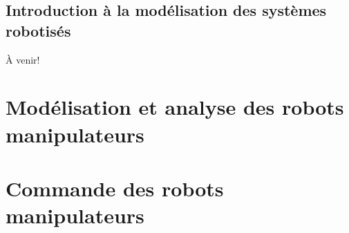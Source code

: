 \documentclass[letterpaper,oneside,french]{book}
\begin{document}

\setcounter{tocdepth}{0}\noptcrule
{\hypersetup{linkcolor=black}
\doparttoc[n]
\tableofcontents
\newpage
}


\chapter{Introduction à la modélisation des systèmes robotisés} À venir!


\part{Modélisation et analyse des robots manipulateurs}
\label{sec:manip}
{\hypersetup{linkcolor=black}
\parttoc
}

% 
% 
% 
% 
% 
% 
% 

\part{Commande des robots manipulateurs}
\label{sec:manip_control}
{\hypersetup{linkcolor=black}
\parttoc
}


% 
% 
% 

\end{document}
